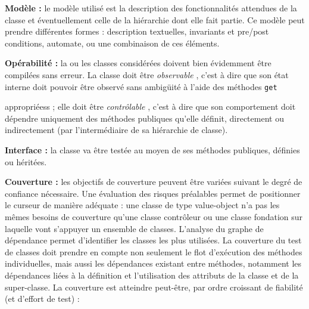 \textbf{Mod\`ele :}
   le mod\`ele utilis\'e est la description
    des fonctionnalit\'es attendues de la classe et \'eventuellement
    celle de la
    hi\'erarchie dont elle fait partie. Ce mod\`ele peut prendre
    diff\'erentes formes : description textuelles, invariants et
    pre/post conditions, automate, ou une combinaison de ces \'el\'ements.

\par
  
\textbf{Op\'erabilit\'e : }
  la ou les classes
    consid\'er\'ees doivent bien \'evidemment \^etre compil\'ees
    sans erreur. La classe doit \^etre 
\emph{observable}
  , c'est
    \`a dire que son \'etat interne doit pouvoir \^etre observ\'e
    sans ambig\"uit\'e \`a l'aide des m\'ethodes 
\texttt{get}
  
    appropri\'eess ; elle doit \^etre 
\emph{contr\^olable}
  ,
    c'est \`a dire que son comportement doit d\'ependre uniquement
    des m\'ethodes publiques qu'elle d\'efinit, directement ou
    indirectement (par l'interm\'ediaire de sa hi\'erarchie de
    classe). 
\par
  
\textbf{Interface :}
  la classe va \^etre test\'ee au moyen de
    ses m\'ethodes publiques, d\'efinies ou h\'erit\'ees.
\par
  
\textbf{Couverture : }
  les objectifs de couverture peuvent
    \^etre vari\'ees suivant le degr\'e de confiance
    n\'ecessaire. Une \'evaluation des risques pr\'ealables permet
    de positionner le curseur de mani\`ere ad\'equate : une classe
    de type value-object n'a pas les m\^emes besoins de couverture
    qu'une classe contr\^oleur ou une classe fondation sur laquelle
    vont s'appuyer un ensemble de classes. L'analyse du graphe de
    d\'ependance permet d'identifier les classes les plus
    utilis\'ees. La couverture du test de classes doit prendre en
    compte non seulement le flot d'ex\'ecution des m\'ethodes
    individuelles, mais aussi les d\'ependances existant entre
    m\'ethodes, notamment les d\'ependances  li\'ees \`a la
    d\'efinition et l'utilisation des attributs de la classe et de la
    super-classe. La couverture est atteindre peut-\^etre, par ordre
    croissant de fiabilit\'e (et d'effort de test) :
     
